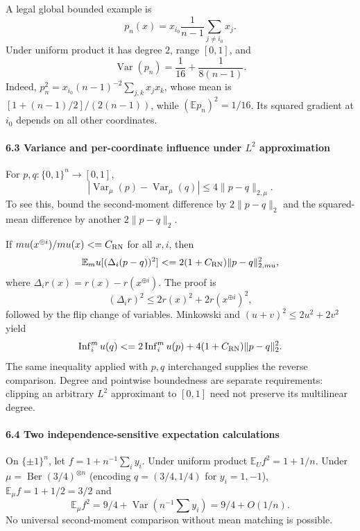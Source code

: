 A legal global bounded example is
\[p_n(x)=x_{i_0}\frac1{n-1}\sum_{j\ne i_0}x_j.\]
Under uniform product it has degree \(2\), range \([0,1]\), and
\[\operatorname{Var}(p_n)=\frac1{16}+\frac1{8(n-1)}.\]
Indeed, \(p_n^2=x_{i_0}(n-1)^{-2}\sum_{j,k}x_jx_k\), whose mean is \([1+(n-1)/2]/(2(n-1))\), while \((\mathbb Ep_n)^2=1/16\). Its squared gradient at \(i_0\) depends on all other coordinates.

\paragraph{\texorpdfstring{6.3 Variance and per-coordinate influence under \(L^2\) approximation}{6.3 Variance and per-coordinate influence under L\^{}2 approximation}}\label{variance-and-per-coordinate-influence-under-l2-approximation}

For \(p,q:\{0,1\}^n\to[0,1]\),
\[|\operatorname{Var}_\mu(p)-\operatorname{Var}_\mu(q)|
\le4\|p-q\|_{2,\mu}.\]
To see this, bound the second-moment difference by \(2\|p-q\|_2\) and the squared-mean difference by another \(2\|p-q\|_2\).

If \(\mu(x^{\oplus i})/\mu(x)\le C_{\rm RN}\) for all \(x,i\), then
\[\mathbb E_\mu[(\Delta_i(p-q))^2]
\le2(1+C_{\rm RN})\|p-q\|_{2,\mu}^2,\]
where \(\Delta_ir(x)=r(x)-r(x^{\oplus i})\). The proof is
\[(\Delta_ir)^2\le2r(x)^2+2r(x^{\oplus i})^2,\]
followed by the flip change of variables. Minkowski and \((u+v)^2\le2u^2+2v^2\) yield
\[\operatorname{Inf}_i^\mu(q)
\le2\operatorname{Inf}_i^\mu(p)+4(1+C_{\rm RN})\|p-q\|_2^2.\]
The same inequality applied with \(p,q\) interchanged supplies the reverse comparison. Degree and pointwise boundedness are separate requirements: clipping an arbitrary \(L^2\) approximant to \([0,1]\) need not preserve its multilinear degree.

\paragraph{6.4 Two independence-sensitive expectation calculations}\label{two-independence-sensitive-expectation-calculations}

On \(\{\pm1\}^n\), let \(f=1+n^{-1}\sum_i y_i\). Under uniform product \(\mathbb E_Uf^2=1+1/n\). Under \(\mu=\operatorname{Ber}(3/4)^{\otimes n}\) (encoding \(q=(3/4,1/4)\) for \(y_i=1,-1\)), \(\mathbb E_\mu f=1+1/2=3/2\) and
\[\mathbb E_\mu f^2=9/4+\operatorname{Var}(n^{-1}\sum y_i)=9/4+O(1/n).\]
No universal second-moment comparison without mean matching is possible.

